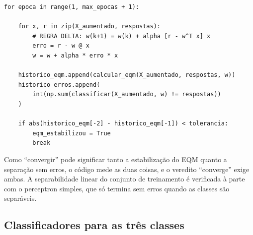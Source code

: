 \documentclass[12pt,a4paper]{article}
\begin{document}
\begin{lstlisting}[title=\texttt{regra\_delta.py} --- laço de treinamento]
for epoca in range(1, max_epocas + 1):

    for x, r in zip(X_aumentado, respostas):
        # REGRA DELTA: w(k+1) = w(k) + alpha [r - w^T x] x
        erro = r - w @ x
        w = w + alpha * erro * x

    historico_eqm.append(calcular_eqm(X_aumentado, respostas, w))
    historico_erros.append(
        int(np.sum(classificar(X_aumentado, w) != respostas))
    )

    if abs(historico_eqm[-2] - historico_eqm[-1]) < tolerancia:
        eqm_estabilizou = True
        break
\end{lstlisting}

Como ``convergir'' pode significar tanto a estabilização do EQM quanto a separação sem erros, o código mede as duas coisas, e o veredito ``converge'' exige ambas. A separabilidade linear do conjunto de treinamento é verificada à parte com o perceptron simples, que só termina sem erros quando as classes são separáveis.

\subsection{Classificadores para as três classes}\label{sec:classificadores}
\end{document}
